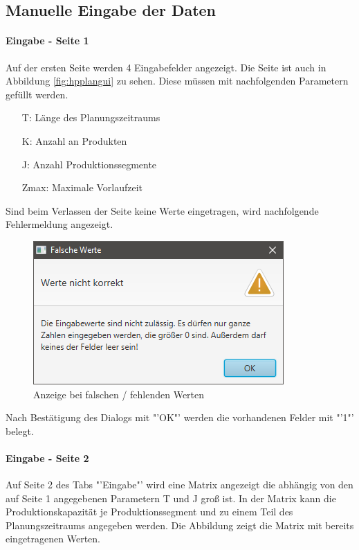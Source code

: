 \documentclass[12pt,a4paper, listof=entryprefix, bibliography=totocnumbered,toc=listofnumbered,lof=listofnumbered]{scrartcl}
\begin{document}
\subsection{Manuelle Eingabe der Daten}

\paragraph{Eingabe - Seite 1}
Auf der ersten Seite werden 4 Eingabefelder angezeigt. Die Seite ist auch in Abbildung \ref{fig:hpplangui} zu sehen. Diese müssen mit nachfolgenden Parametern gefüllt werden.

\begin{itemize}
	\item[T:] Länge des Planungszeitraums
	\item[K:] Anzahl an Produkten
	\item[J:] Anzahl Produktionssegmente
	\item[Zmax:] Maximale Vorlaufzeit
\end{itemize}

Sind beim Verlassen der Seite keine Werte eingetragen, wird nachfolgende Fehlermeldung angezeigt.

\begin{figure}[H]
	\centering
	\includegraphics[width=.5\linewidth]{images/falscheWerte.png} 
	\caption{Anzeige bei falschen / fehlenden Werten}
	\label{fig:falscheWerte}
\end{figure}

Nach Bestätigung des Dialogs mit "'OK"' werden die vorhandenen Felder mit "'1"' belegt.

\paragraph{Eingabe - Seite 2}
Auf Seite 2 des Tabs "'Eingabe"' wird eine Matrix angezeigt die abhängig von den auf Seite 1 angegebenen Parametern T und J groß ist. In der Matrix kann die Produktionskapazität je Produktionssegment und zu einem Teil des Planungszeitraums angegeben werden. Die Abbildung zeigt die Matrix mit bereits eingetragenen Werten.
\end{document}
